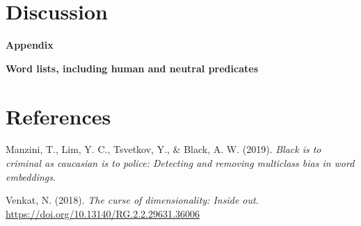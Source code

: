 \documentclass[10pt,dvipsnames,enabledeprecatedfontcommands]{scrartcl}
\begin{document}
\section{Discussion}\label{discussion}

\newpage

\noindent \huge  \textbf{Appendix} \normalsize

\noindent \Large \textbf{Word lists, including human and neutral predicates}
\normalsize

\section*{References}\label{references}

\vspace{-3mm}

\hypertarget{refs}{}
\hypertarget{ref-Manzini2019blackToCriminal}{}
Manzini, T., Lim, Y. C., Tsvetkov, Y., \& Black, A. W. (2019).
\emph{Black is to criminal as caucasian is to police: Detecting and
removing multiclass bias in word embeddings}.

\hypertarget{ref-Venkat2018Curse}{}
Venkat, N. (2018). \emph{The curse of dimensionality: Inside out}.
\url{https://doi.org/10.13140/RG.2.2.29631.36006}
\end{document}
